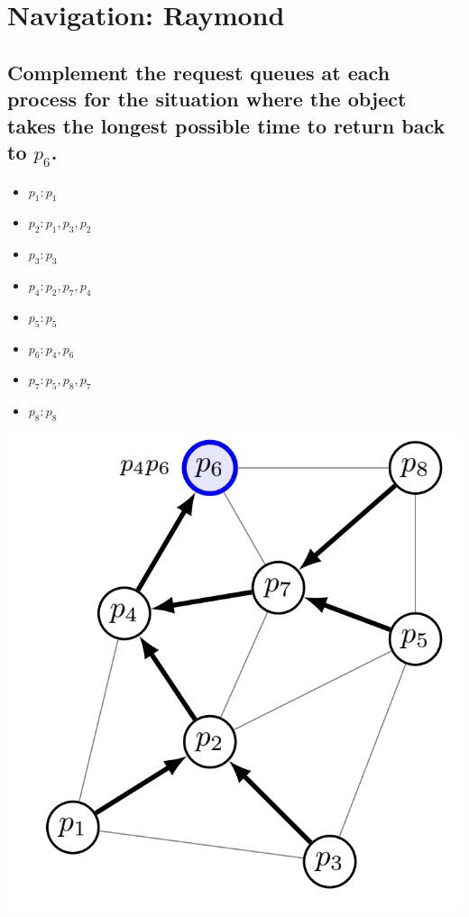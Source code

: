 \documentclass{article}
\begin{document}
\section{Navigation: Raymond}

\subsection{Complement the request queues at each process for the situation where the object takes the longest possible time to return back to $p_6$.}


\begin{minipage}{.45\textwidth}
  \begin{itemize}
    \item $p_1: p_1$
    \item $p_2: p_1, p_3, p_2$
    \item $p_3: p_3$
    \item $p_4: p_2, p_7, p_4$
    \item $p_5: p_5$
    \item $p_6: p_4, p_6$
    \item $p_7: p_5, p_8, p_7$
    \item $p_8: p_8$
  \end{itemize}
\end{minipage}
\begin{minipage}{.45\textwidth}
  \includegraphics[width=\textwidth]{p1}
\end{minipage}
\end{document}
